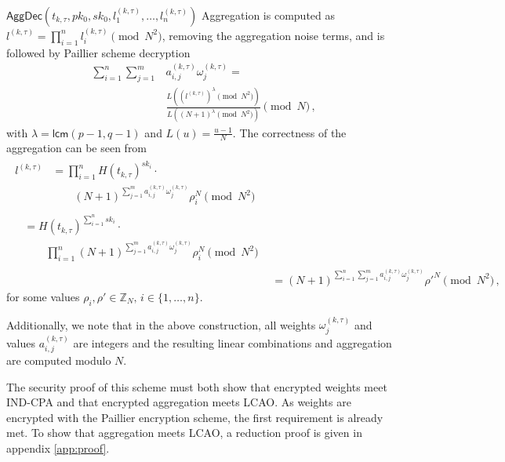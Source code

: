 \documentclass[10pt,letterpaper,oneside,twocolumn,journal]{IEEEtran}
\theoremstyle{definition}
\theoremstyle{definition}
\theoremstyle{remark}
\begin{document}
\begin{LaTeXdescription}
    \item[$\mathsf{AggDec}(t_{k,\tau}, pk_0, sk_0, l^{(k,\tau)}_1,\dots,l^{(k,\tau)}_n)$] Aggregation is computed as $l^{(k,\tau)} = \prod^n_{i=1}l^{(k,\tau)}_i \pmod{N^2}$, removing the aggregation noise terms, and is followed by Paillier scheme decryption
    \begin{equation}
        \begin{split}
            \sum^{n}_{i=1}\sum^{m}_{j=1}&a^{(k,\tau)}_{i,j}\omega^{(k,\tau)}_j =\\
            &\frac{L((l^{(k,\tau)})^\lambda\pmod{N^2})}{L((N+1)^\lambda\pmod{N^2})} \pmod{N}\,,
        \end{split} \label{eqn:our_scheme_decrypt}
    \end{equation}
    with $\lambda = \mathsf{lcm}(p-1, q-1)$ and $L(u) = \frac{u-1}{N}$. The correctness of the aggregation can be seen from
    \begin{align*}
        \begin{split}
        l^{(k,\tau)} &= \prod^n_{i=1}H(t_{k,\tau})^{sk_i}\cdot \\
        &\qquad (N+1)^{\sum^{m}_{j=1}a^{(k,\tau)}_{i,j}\omega^{(k,\tau)}_j}\rho_i^N \!\!\pmod{N^2}
        \end{split}\\
        \begin{split}
            &= H(t_{k,\tau})^{\sum^n_{i=1}sk_i}\cdot \\
            &\qquad \prod^n_{i=1}(N+1)^{\sum^{m}_{j=1}a^{(k,\tau)}_{i,j}\omega^{(k,\tau)}_j}\rho_i^N \!\!\pmod{N^2}
        \end{split}\\
        &= (N+1)^{\sum^n_{i=1}\sum^{m}_{j=1}a^{(k,\tau)}_{i,j}\omega^{(k,\tau)}_j}\rho'^N \!\!\pmod{N^2}\,,
    \end{align*}
    for some values $\rho_i,\rho' \in \mathbb{Z}_N,\,i\in\{1,\dots,n\}$.
\end{LaTeXdescription}
Additionally, we note that in the above construction, all weights $\omega^{(k,\tau)}_j$ and values $a^{(k,\tau)}_{i,j}$ are integers and the resulting linear combinations and aggregation are computed modulo $N$. 

The security proof of this scheme must both show that encrypted weights meet IND-CPA and that encrypted aggregation meets LCAO. As weights are encrypted with the Paillier encryption scheme, the first requirement is already met. To show that aggregation meets LCAO, a reduction proof is given in appendix \ref{app:proof}.
\end{document}
